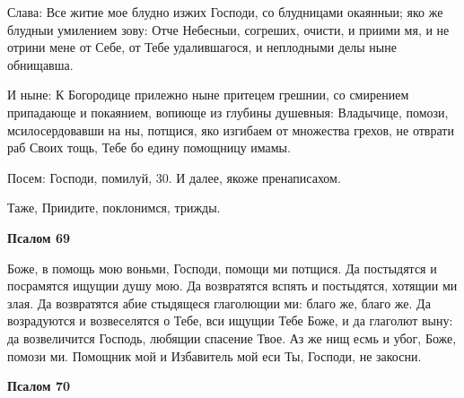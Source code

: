Слава: Все житие мое блудно изжих Господи, со блудницами окаянныи; яко же блудныи умилением зову: Отче Небесныи, согреших, очисти, и приими мя, и не отрини мене от Себе, от Тебе удалившагося, и неплодными делы ныне обнищавша.


И ныне: К Богородице прилежно ныне притецем грешнии, со смирением припадающе и покаянием, вопиюще из глубины душевныя: Владычице, помози, мсилосердовавши на ны, потщися, яко изгибаем от множества грехов, не отврати раб Своих тощь, Тебе бо едину помощницу имамы.


Посем: Господи, помилуй, 30. И далее, якоже пренаписахом.


Таже, Приидите, поклонимся, трижды.





\bfseries Псалом 69\normalfont{}


Боже, в помощь мою воньми, Господи, помощи ми потщися. Да постыдятся и посрамятся ищущии душу мою. Да возвратятся вспять и постыдятся, хотящии ми злая. Да возвратятся абие стыдящеся глаголющии ми: благо же, благо же. Да возрадуются и возвеселятся о Тебе, вси ищущии Тебе Боже, и да глаголют выну: да возвеличится Господь, любящии спасение Твое. Аз же нищ есмь и убог, Боже, помози ми. Помощник мой и Избавитель мой еси Ты, Господи, не закосни.





\bfseries Псалом 70\normalfont{}


